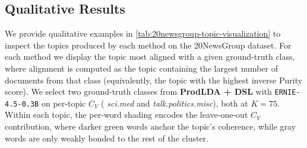 \documentclass{article}
\theoremstyle{plain}
\theoremstyle{definition}
\theoremstyle{remark}
\begin{document}




\subsection{Qualitative Results}
We provide qualitative examples in
\autoref{tab:20newsgroup-topic-visualization} to inspect the topics produced
by each method on the 20NewsGroup dataset. For each method we display the
topic most aligned with a given ground-truth class, where alignment is
computed as the topic containing the largest number of documents from that
class (equivalently, the topic with the highest inverse Purity score). We
 select two ground-truth classes from
\textbf{ProdLDA + DSL} with \texttt{ERNIE-4.5-0.3B} on per-topic $C_V$ ( \textit{sci.med} and
\textit{talk.politics.misc}), both at $K=75$. Within each topic, the
per-word shading encodes the leave-one-out $C_V$ contribution, where darker
green words anchor the topic's coherence, while gray words are only
weakly bonded to the rest of the cluster.
\end{document}
